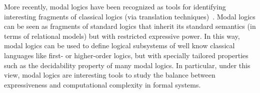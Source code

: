 More recently, modal logics have been recognized as tools for identifying interesting 
fragments of classical logics (via translation techniques)~\cite{Blackburnetal2007}. 
Modal logics can be seen as fragments of standard logics that inherit its standard semantics
(in terms of relational models) but with restricted expressive power. 
In this way, modal logics can be used to define logical subsystems of well know classical 
languages like first- or higher-order logics, but with specially tailored properties 
such as the decidability property of many modal logics. In
particular, under this view, modal logics are interesting tools to study the
balance between expressiveness and computational complexity in formal systems.

%
%
%
%
%
%
%
%
%
%

